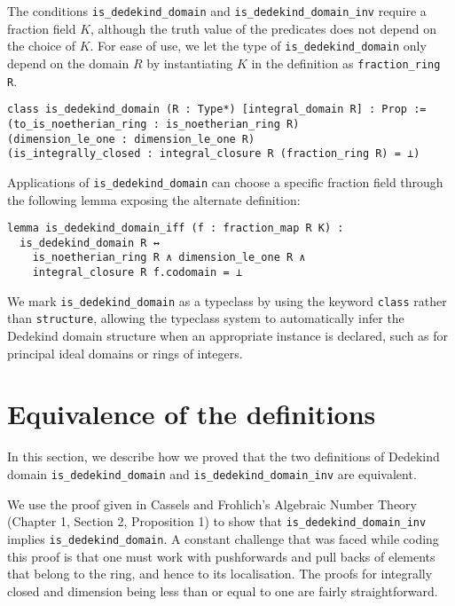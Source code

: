\documentclass[a4paper,USenglish,cleveref, autoref, thm-restate]{lipics-v2021}
\newcommand{\lean}[1]{\texttt{#1}\xspace} %
\begin{document}
The conditions \lean{is\_dedekind\_domain} and \lean{is\_dedekind\_domain\_inv} require a fraction field $K$,
although the truth value of the predicates does not depend on the choice of $K$.
For ease of use, we let the type of \lean{is\_dedekind\_domain} only depend on the domain $R$
by instantiating $K$ in the definition as \lean{fraction\_ring R}.
\begin{lstlisting}
class is_dedekind_domain (R : Type*) [integral_domain R] : Prop :=
(to_is_noetherian_ring : is_noetherian_ring R)
(dimension_le_one : dimension_le_one R)
(is_integrally_closed : integral_closure R (fraction_ring R) = ⊥)
\end{lstlisting}
Applications of \lean{is\_dedekind\_domain} can choose a specific fraction field through the following lemma exposing the alternate definition:
\begin{lstlisting}
lemma is_dedekind_domain_iff (f : fraction_map R K) :
  is_dedekind_domain R ↔
    is_noetherian_ring R ∧ dimension_le_one R ∧
    integral_closure R f.codomain = ⊥
\end{lstlisting}

We mark \lean{is\_dedekind\_domain} as a typeclass by using the keyword \lean{class} rather than \lean{structure},
allowing the typeclass system to automatically infer the Dedekind domain structure when an appropriate instance is declared,
such as for principal ideal domains or rings of integers.

\section{Equivalence of the definitions} \label{sec:equivalence}

In this section, we describe how we proved that the two definitions of Dedekind domain \lean{is\_dedekind\_domain} and \lean{is\_dedekind\_domain\_inv} are equivalent.

We use the proof given in Cassels and Frohlich's Algebraic Number Theory (Chapter 1, Section 2, Proposition 1) to show that \lean{is\_dedekind\_domain\_inv} implies \lean{is\_dedekind\_domain}. A constant challenge that was faced while coding this proof is that one must work with pushforwards and pull backs of elements that belong to the ring, and hence to its localisation. The proofs for integrally closed and dimension being less than or equal to one are fairly straightforward.
\end{document}

